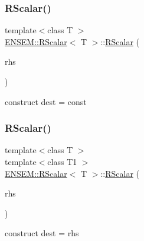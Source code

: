 \subsubsection{\texorpdfstring{RScalar()}{RScalar()}\hspace{0.1cm}{\footnotesize\ttfamily [7/10]}}
{\footnotesize\ttfamily template$<$class T $>$ \\
\mbox{\hyperlink{classENSEM_1_1RScalar}{E\+N\+S\+E\+M\+::\+R\+Scalar}}$<$ T $>$\+::\mbox{\hyperlink{classENSEM_1_1RScalar}{R\+Scalar}} (\begin{DoxyParamCaption}\item[{const typename \mbox{\hyperlink{structENSEM_1_1WordType}{Word\+Type}}$<$ T $>$\+::Type\+\_\+t \&}]{rhs }\end{DoxyParamCaption})\hspace{0.3cm}{\ttfamily [inline]}}



construct dest = const 

\mbox{\label{classENSEM_1_1RScalar_a93e56021a00d35af008ae72de2eb60f2}} 
\subsubsection{\texorpdfstring{RScalar()}{RScalar()}\hspace{0.1cm}{\footnotesize\ttfamily [8/10]}}
{\footnotesize\ttfamily template$<$class T $>$ \\
template$<$class T1 $>$ \\
\mbox{\hyperlink{classENSEM_1_1RScalar}{E\+N\+S\+E\+M\+::\+R\+Scalar}}$<$ T $>$\+::\mbox{\hyperlink{classENSEM_1_1RScalar}{R\+Scalar}} (\begin{DoxyParamCaption}\item[{const \mbox{\hyperlink{classENSEM_1_1RScalar}{R\+Scalar}}$<$ T1 $>$ \&}]{rhs }\end{DoxyParamCaption})\hspace{0.3cm}{\ttfamily [inline]}}



construct dest = rhs 

\mbox{\label{classENSEM_1_1RScalar_aef7513413ed5dbf6bb8bc37b73b88d00}} 
